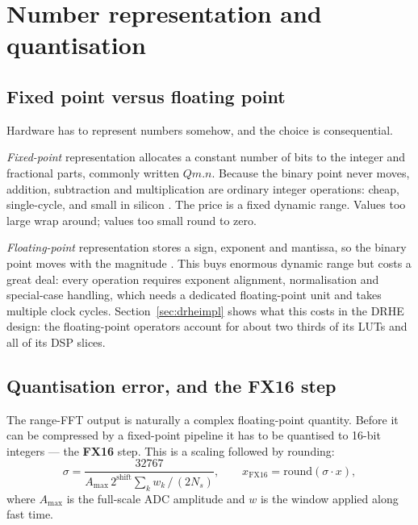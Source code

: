 \section{Number representation and quantisation}
\label{sec:numbers}

\subsection{Fixed point versus floating point}

Hardware has to represent numbers somehow, and the choice is consequential.

\emph{Fixed-point} representation allocates a constant number of bits to the
integer and fractional parts, commonly written $Qm.n$. Because the binary point
never moves, addition, subtraction and multiplication are ordinary integer
operations: cheap, single-cycle, and small in silicon \cite{parhami2010}. The
price is a fixed dynamic range. Values too large wrap around; values too small
round to zero.

\emph{Floating-point} representation stores a sign, exponent and mantissa, so
the binary point moves with the magnitude \cite{ieee754}. This buys enormous
dynamic range but costs a great deal: every operation requires exponent
alignment, normalisation and special-case handling, which needs a dedicated
floating-point unit and takes multiple clock cycles. Section~\ref{sec:drheimpl}
shows what this costs in the DRHE design: the floating-point operators account
for about two thirds of its LUTs and all of its DSP slices.

\subsection{Quantisation error, and the FX16 step}
\label{sec:fx16}

The range-FFT output is naturally a complex floating-point quantity. Before it
can be compressed by a fixed-point pipeline it has to be quantised to 16-bit
integers --- the \textbf{FX16} step. This is a scaling followed by rounding:
\begin{equation}
\label{eq:scale}
\sigma = \frac{32767}{A_{\max}\,2^{\mathrm{shift}} \sum_k w_k \,/\, (2 N_s)},
\qquad
x_{\mathrm{FX16}} = \mathrm{round}(\sigma \cdot x),
\end{equation}
where $A_{\max}$ is the full-scale ADC amplitude and $w$ is the window applied
along fast time.

